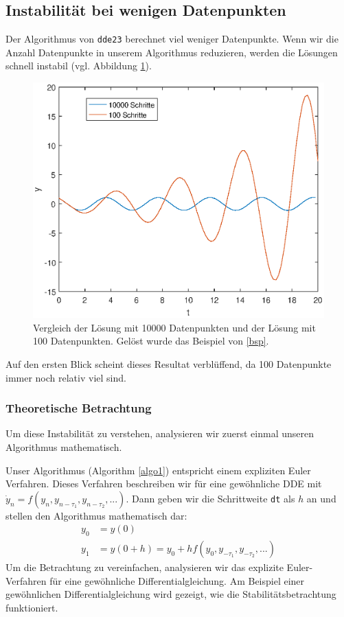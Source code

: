 \subsection{Instabilität bei wenigen Datenpunkten} \label{num:instabil}
Der Algorithmus von \texttt{dde23} berechnet viel weniger Datenpunkte.
Wenn wir die Anzahl Datenpunkte in unserem Algorithmus reduzieren, werden die Lösungen schnell instabil (vgl. Abbildung \ref{fig:instab100}).
\begin{figure}
	\centering
	\includegraphics{verzoegert/inp/figures/instab100.eps}
	\caption{Vergleich der Lösung mit 10000 Datenpunkten und der Lösung mit 100 Datenpunkten. Gelöst wurde das Beispiel von \eqref{bsp}.}
	\label{fig:instab100}
\end{figure}
Auf den ersten Blick scheint dieses Resultat verblüffend, da 100 Datenpunkte immer noch relativ viel sind.

\subsubsection{Theoretische Betrachtung}
Um diese Instabilität zu verstehen, analysieren wir zuerst einmal unseren Algorithmus mathematisch.

Unser Algorithmus (Algorithm \ref{algo1}) entspricht einem expliziten Euler Verfahren.
Dieses Verfahren beschreiben wir für eine gewöhnliche DDE mit $\dot{y}_n = f(y_n,y_{n-\tau_1},y_{n-\tau_2},...)$.
Dann geben wir die Schrittweite \texttt{dt} als $h$ an und stellen den Algorithmus mathematisch dar:
\begin{align}
	y_0 &= y(0)\\
	y_1 &= y(0+h) = y_0 + hf(y_0,y_{-\tau_1},y_{-\tau_2},...)
\end{align} 
Um die Betrachtung zu vereinfachen, analysieren wir das explizite Euler-Verfahren für eine gewöhnliche Differentialgleichung.
Am Beispiel einer gewöhnlichen Differentialgleichung wird gezeigt, wie die Stabilitätsbetrachtung funktioniert.

